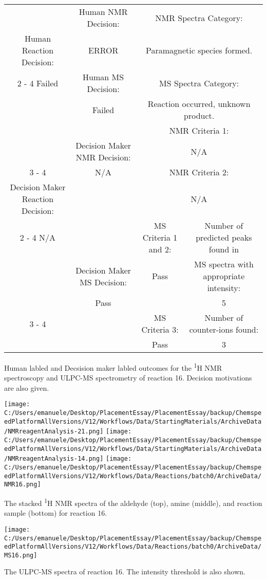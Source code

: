 \documentclass{article}%
\begin{document}
\begin{Decision Table}[H]%
\begin{tabular}{|c|c|c|c|}%
\hline%
&Human NMR Decision:&\multicolumn{2}{|c|}{NMR Spectra Category:}\\%
Human Reaction Decision:&ERROR&\multicolumn{2}{|c|}{Paramagnetic species formed.}\\%
\cline{2%
-%
4}%
Failed&Human MS Decision:&\multicolumn{2}{|c|}{MS Spectra Category:}\\%
&Failed&\multicolumn{2}{|c|}{Reaction occurred, unknown product.}\\%
\hline%
&&\multicolumn{2}{|c|}{NMR Criteria 1:}\\%
&Decision Maker NMR Decision:&\multicolumn{2}{|c|}{N/A}\\%
\cline{3%
-%
4}%
&N/A&\multicolumn{2}{|c|}{NMR Criteria 2:}\\%
Decision Maker Reaction Decision:&&\multicolumn{2}{|c|}{N/A}\\%
\cline{2%
-%
4}%
N/A&&MS Criteria 1 and 2:&Number of predicted peaks found in\\%
&Decision Maker MS Decision:&Pass&MS spectra with appropriate intensity:\\%
&Pass&&5\\%
\cline{3%
-%
4}%
&&MS Criteria 3:&Number of counter{-}ions found:\\%
&&Pass&3\\%
\hline%
\end{tabular}%
\caption{Human labled and Decsision maker labled outcomes for the \textsuperscript{1}H NMR spectroscopy and ULPC-MS spectrometry of reaction 16. Decision motivations are also given.}%
\end{Decision Table}%
\begin{NMR Spectra}[H]%
\begin{center}%
\texttt{[image: C:/Users/emanuele/Desktop/PlacementEssay/PlacementEssay/backup/ChemspeedPlatformAllVersions/V12/Workflows/Data/StartingMaterials/ArchiveData/NMRreagentAnalysis-21.png]}\hfill%
\texttt{[image: C:/Users/emanuele/Desktop/PlacementEssay/PlacementEssay/backup/ChemspeedPlatformAllVersions/V12/Workflows/Data/StartingMaterials/ArchiveData/NMRreagentAnalysis-14.png]}\hfill%
\texttt{[image: C:/Users/emanuele/Desktop/PlacementEssay/PlacementEssay/backup/ChemspeedPlatformAllVersions/V12/Workflows/Data/Reactions/batch0/ArchiveData/NMR16.png]}\hfill%
\end{center}%
\caption{The stacked \textsuperscript{1}H NMR spectra of the aldehyde (top), amine (middle), and reaction sample (bottom) for reaction 16.}%
\end{NMR Spectra}%
\begin{MS Spectra}[H]%
\begin{center}%
\texttt{[image: C:/Users/emanuele/Desktop/PlacementEssay/PlacementEssay/backup/ChemspeedPlatformAllVersions/V12/Workflows/Data/Reactions/batch0/ArchiveData/MS16.png]}\hfill%
\end{center}%
\caption{The ULPC-MS spectra of reaction 16. The intensity threshold is also shown.}%
\end{MS Spectra}%
\end{document}
